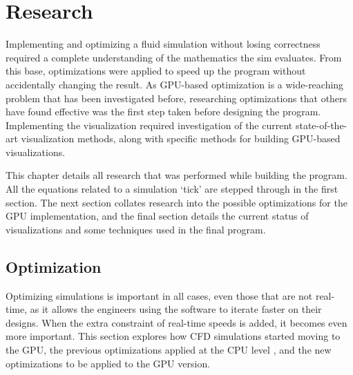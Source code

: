
\chapter{Research}
\label{sec:Research} 

Implementing and optimizing a fluid simulation without losing correctness required a complete understanding of the mathematics the sim evaluates.
From this base, optimizations were applied to speed up the program without accidentally changing the result.
As GPU-based optimization is a wide-reaching problem that has been investigated before, researching optimizations that others have found effective was the first step taken before designing the program.
Implementing the visualization required investigation of the current state-of-the-art visualization methods, along with specific methods for building GPU-based visualizations.

This chapter details all research that was performed while building the program.
All the equations related to a simulation `tick' are stepped through in the first section.
The next section collates research into the possible optimizations for the GPU implementation, and the final section details the current status of visualizations and some techniques used in the final program.



\section{Optimization}
\label{sec:Research:Optimization}
Optimizing simulations is important in all cases, even those that are not real-time, as it allows the engineers using the software to iterate faster on their designs.
When the extra constraint of real-time speeds is added, it becomes even more important.
This section explores how CFD simulations started moving to the GPU, the previous optimizations applied at the CPU level
, and the new optimizations to be applied to the GPU version.

